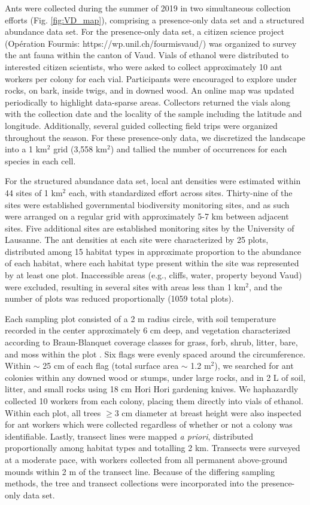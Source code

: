 \documentclass[preprint,review,times,12pt,3p]{elsarticle}
\begin{document}
Ants were collected during the summer of 2019 in two simultaneous collection efforts (Fig. \ref{fig:VD_map}), comprising a presence-only data set and a structured abundance data set. For the presence-only data set, a citizen science project (Opération Fourmis: https://wp.unil.ch/fourmisvaud/) was organized to survey the ant fauna within the canton of Vaud. Vials of ethanol were distributed to interested citizen scientists, who were asked to collect approximately 10 ant workers per colony for each vial. Participants were encouraged to explore under rocks, on bark, inside twigs, and in downed wood. An online map was updated periodically to highlight data-sparse areas. Collectors returned the vials along with the collection date and the locality of the sample including the latitude and longitude. Additionally, several guided collecting field trips were organized throughout the season. For these presence-only data, we discretized the landscape into a 1 km$^2$ grid (3,558 km$^2$) and tallied the number of occurrences for each species in each cell. 

For the structured abundance data set, local ant densities were estimated within 44 sites of 1 km$^2$ each, with standardized effort across sites. Thirty-nine of the sites were established governmental biodiversity monitoring sites, and as such were arranged on a regular grid with approximately 5-7 km between adjacent sites. Five additional sites are established monitoring sites by the University of Lausanne. The ant densities at each site were characterized by 25 plots, distributed among 15 habitat types \citep{Gago-Silva2017} in approximate proportion to the abundance of each habitat, where each habitat type present within the site was represented by at least one plot. Inaccessible areas (e.g., cliffs, water, property beyond Vaud) were excluded, resulting in several sites with areas less than 1 km$^2$, and the number of plots was reduced proportionally (1059 total plots). 

Each sampling plot consisted of a 2 m radius circle, with soil temperature recorded in the center approximately 6 cm deep, and vegetation characterized according to Braun-Blanquet coverage classes for grass, forb, shrub, litter, bare, and moss within the plot \citep{Douglas1978}. Six flags were evenly spaced around the circumference. Within $\sim$ 25 cm of each flag (total surface area $\sim$ 1.2 m$^2$), we searched for ant colonies within any downed wood or stumps, under large rocks, and in 2 L of soil, litter, and small rocks using 18 cm Hori Hori gardening knives. We haphazardly collected 10 workers from each colony, placing them directly into vials of ethanol. Within each plot, all trees $\geq$3 cm diameter at breast height were also inspected for ant workers which were collected regardless of whether or not a colony was identifiable. Lastly, transect lines were mapped \emph{a priori}, distributed proportionally among habitat types and totalling 2 km. Transects were surveyed at a moderate pace, with workers collected from all permanent above-ground mounds within 2 m of the transect line. Because of the differing sampling methods, the tree and transect collections were incorporated into the presence-only data set. 
\end{document}
